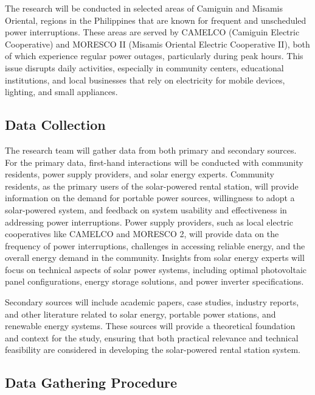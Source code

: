 {The research will be conducted in selected areas of Camiguin and Misamis Oriental, regions in the Philippines that are known for frequent and unscheduled power interruptions. These areas are served by CAMELCO (Camiguin Electric Cooperative) and MORESCO II (Misamis Oriental Electric Cooperative II), both of which experience regular power outages, particularly during peak hours. This issue disrupts daily activities, especially in community centers, educational institutions, and local businesses that rely on electricity for mobile devices, lighting, and small appliances.


\subsection{Data Collection}

The research team will gather data from both primary and secondary sources. For the primary data, first-hand interactions will be conducted with community residents, power supply providers, and solar energy experts. Community residents, as the primary users of the solar-powered rental station, will provide information on the demand for portable power sources, willingness to adopt a solar-powered system, and feedback on system usability and effectiveness in addressing power interruptions. Power supply providers, such as local electric cooperatives like CAMELCO and MORESCO 2, will provide data on the frequency of power interruptions, challenges in accessing reliable energy, and the overall energy demand in the community. Insights from solar energy experts will focus on technical aspects of solar power systems, including optimal photovoltaic panel configurations, energy storage solutions, and power inverter specifications.

Secondary sources will include academic papers, case studies, industry reports, and other literature related to solar energy, portable power stations, and renewable energy systems. These sources will provide a theoretical foundation and context for the study, ensuring that both practical relevance and technical feasibility are considered in developing the solar-powered rental station system.

\subsection{Data Gathering Procedure}

}
